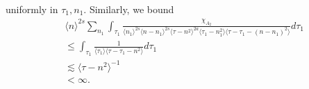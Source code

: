 \documentclass[12pt,reqno]{amsart}
\numberwithin{equation}{section}  %
\begin{document}
uniformly in $\tau_{1}, n_{1}$. 
Similarly, we bound
\begin{equation}
\begin{split}
& \langle n
\rangle ^{2s}
\sum_{n_{1}} \int_{\tau_{1}} \frac{\chi_{A_{2}}}{\langle n_{1} \rangle ^{2s}
\langle n-n_{1} \rangle ^{2s} 
\langle \tau - n^{2} \rangle^{2a} 
\langle \tau_{1} - n_{1}^{2} \rangle \langle  \tau - \tau_{1} -
(n - n_{1})^{2} \rangle}
d \tau_1 
\\
& \le 
\int_{\tau_{1}} \frac{1}{\langle \tau_{1} \rangle  \langle \tau -
\tau_{1} - n^{2} \rangle}
d \tau_1 
\\
& \lesssim   \langle \tau - n^{2} \rangle ^{-1} 
\\
& < \infty.
\end{split}
\end{equation}
\end{document}
